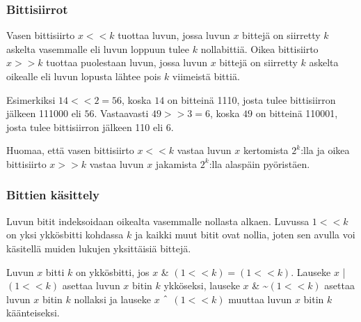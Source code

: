 \subsubsection{Bittisiirrot}


Vasen bittisiirto $x < < k$ tuottaa luvun, jossa luvun $x$ bittejä
on siirretty $k$ askelta vasemmalle eli
luvun loppuun tulee $k$ nollabittiä.
Oikea bittisiirto $x > > k$ tuottaa puolestaan
luvun, jossa luvun $x$ bittejä
on siirretty $k$ askelta oikealle eli
luvun lopusta lähtee pois $k$ viimeistä bittiä.

Esimerkiksi $14 < < 2 = 56$,
koska $14$ on bitteinä 1110,
josta tulee bittisiirron jälkeen 111000 eli $56$.
Vastaavasti $49 > > 3 = 6$,
koska $49$ on bitteinä 110001,
josta tulee bittisiirron jälkeen 110 eli $6$.

Huomaa, että vasen bittisiirto $x < < k$
vastaa luvun $x$ kertomista $2^k$:lla
ja oikea bittisiirto $x > > k$
vastaa luvun $x$ jakamista $2^k$:lla
alaspäin pyöristäen.

\subsubsection{Bittien käsittely}

Luvun bitit indeksoidaan oikealta vasemmalle
nollasta alkaen.
Luvussa $1 < < k$ on yksi ykkösbitti
kohdassa $k$ ja kaikki muut bitit ovat nollia, joten sen avulla voi käsitellä
muiden lukujen yksittäisiä bittejä.

Luvun $x$ bitti $k$ on ykkösbitti, jos
$x$ \& $(1 < < k) = (1 < < k)$.
Lauseke $x$ | $(1 < < k)$ asettaa luvun $x$ bitin $k$
ykköseksi, lauseke
$x$ \& \textasciitilde $(1 < < k)$
asettaa luvun $x$ bitin $k$ nollaksi ja
lauseke $x$ $\XOR$ $(1 < < k)$
muuttaa luvun $x$ bitin $k$ käänteiseksi.
% 
% 
% 

